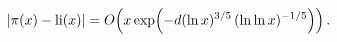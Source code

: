 \[\left|\mathop{\pi\/}\nolimits\!\left(x\right)-\mathop{\mathrm{li}\/}\nolimits%
\!\left(x\right)\right|=\mathop{O\/}\nolimits\!\left(x\mathop{\exp\/}\nolimits%
\!\left(-d(\mathop{\ln\/}\nolimits x)^{3/5}\,(\mathop{\ln\/}\nolimits\mathop{%
\ln\/}\nolimits x)^{-1/5}\right)\right).\]